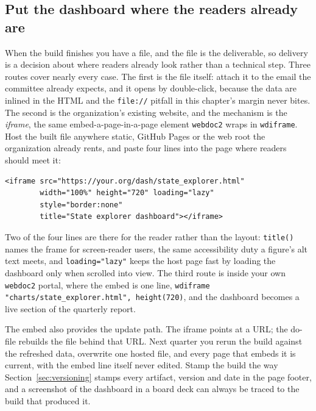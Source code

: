 \subsection{Put the dashboard where the readers already are}
When the build finishes you have a file, and the file is the deliverable, so delivery is a decision about where readers already look rather than a technical step. Three routes cover nearly every case. The first is the file itself: attach it to the email the committee already expects, and it opens by double-click, because the data are inlined in the HTML and the \texttt{file://} pitfall in this chapter's margin never bites. The second is the organization's existing website, and the mechanism is the \emph{iframe}, the same embed-a-page-in-a-page element \texttt{webdoc2} wraps in \texttt{wdiframe}. Host the built file anywhere static, GitHub Pages or the web root the organization already rents, and paste four lines into the page where readers should meet it:
\par
{\footnotesize
\begin{verbatim}
<iframe src="https://your.org/dash/state_explorer.html"
        width="100%" height="720" loading="lazy"
        style="border:none"
        title="State explorer dashboard"></iframe>
\end{verbatim}
}
Two of the four lines are there for the reader rather than the layout: \texttt{title()} names the frame for screen-reader users, the same accessibility duty a figure's alt text meets, and \texttt{loading="lazy"} keeps the host page fast by loading the dashboard only when scrolled into view. The third route is inside your own \texttt{webdoc2} portal, where the embed is one line, \texttt{wdiframe "charts/state\_explorer.html", height(720)}, and the dashboard becomes a live section of the quarterly report.

The embed also provides the update path. The iframe points at a URL; the do-file rebuilds the file behind that URL. Next quarter you rerun the build against the refreshed data, overwrite one hosted file, and every page that embeds it is current, with the embed line itself never edited. Stamp the build the way Section~\ref{sec:versioning} stamps every artifact, version and date in the page footer, and a screenshot of the dashboard in a board deck can always be traced to the build that produced it.

